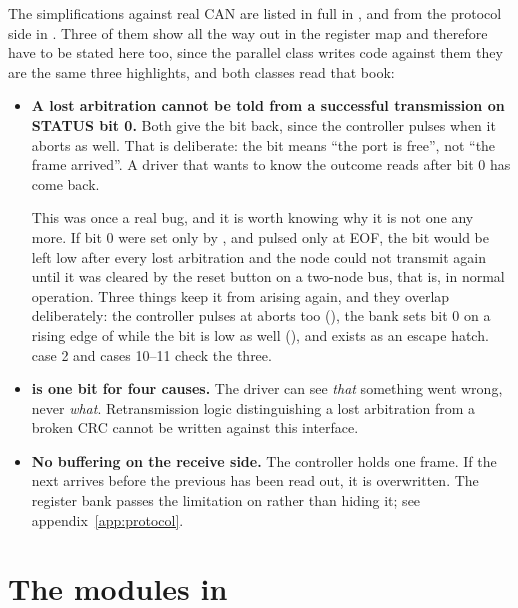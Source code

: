 The simplifications against real CAN are listed in full in , and from the
protocol side in . Three of them show all the way out in the register map and therefore have
to be stated here too, since the parallel class writes code against them \textemdash{} they are the
same three \canbook{} highlights, and both classes read that book:

\begin{itemize}
  \item \textbf{A lost arbitration cannot be told from a successful transmission on STATUS bit 0.}
    Both give the bit back, since the controller pulses  when it aborts as well. That is
    deliberate: the bit means ``the port is free'', not ``the frame arrived''. A driver that wants to
    know the outcome reads  after bit 0 has come back.

    This was once a real bug, and it is worth knowing why it is not one any more. If bit 0 were set
    only by , and  pulsed only at EOF, the bit would be left low after
    every lost arbitration and the node could not transmit again until it was cleared by the reset
    button \textemdash{} on a two-node bus, that is, in normal operation. Three things keep it from
    arising again, and they overlap deliberately: the controller pulses  at aborts too
    (), the bank sets bit 0 on a rising edge of  while the bit is low as
    well (), and  exists as an escape hatch.
     case 2 and  cases 10--11 check the three.
  \item \textbf{ is one bit for four causes.} The driver can see \emph{that} something
    went wrong, never \emph{what}. Retransmission logic distinguishing a lost arbitration from a
    broken CRC cannot be written against this interface.
  \item \textbf{No buffering on the receive side.} The controller holds one frame. If the next
    arrives before the previous has been read out, it is overwritten. The register bank passes the
    limitation on rather than hiding it; see appendix~\ref{app:protocol}.
\end{itemize}

\section{The modules in }
\label{app:project:bridge}

